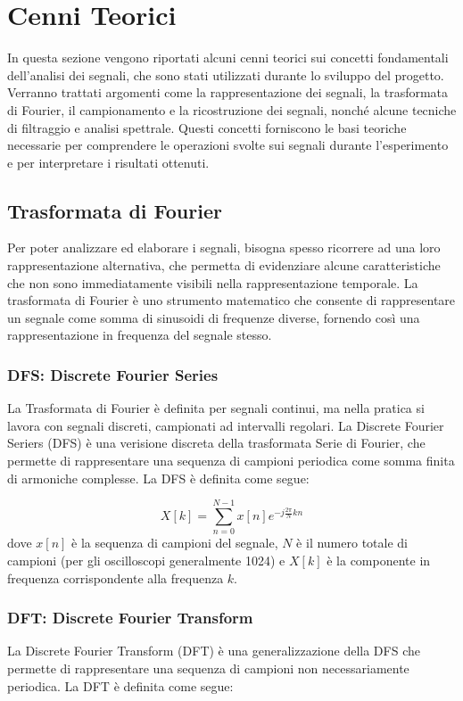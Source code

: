 \section{Cenni Teorici}
\label{sec:Teoria}
\thispagestyle{plain}
In questa sezione vengono riportati alcuni cenni teorici sui concetti fondamentali dell'analisi dei segnali, che sono stati utilizzati durante lo sviluppo del progetto. Verranno trattati argomenti come la rappresentazione dei segnali, la trasformata di Fourier, il campionamento e la ricostruzione dei segnali, nonché alcune tecniche di filtraggio e analisi spettrale. Questi concetti forniscono le basi teoriche necessarie per comprendere le operazioni svolte sui segnali durante l'esperimento e per interpretare i risultati ottenuti.

\subsection{Trasformata di Fourier}
Per poter analizzare ed elaborare i segnali, bisogna spesso ricorrere ad una loro rappresentazione alternativa, che permetta di evidenziare alcune caratteristiche che non sono immediatamente visibili nella rappresentazione temporale. La trasformata di Fourier è uno strumento matematico che consente di rappresentare un segnale come somma di sinusoidi di frequenze diverse, fornendo così una rappresentazione in frequenza del segnale stesso. 

\subsubsection{DFS: Discrete Fourier Series}
La Trasformata di Fourier è definita per segnali continui, ma nella pratica si lavora con segnali discreti, campionati ad intervalli regolari. La Discrete Fourier Seriers (DFS) è una verisione discreta della trasformata Serie di Fourier, che permette di rappresentare una sequenza di campioni periodica come somma finita di armoniche complesse. La DFS è definita come segue:

\begin{equation}
    \label{sec:DFS}
    X[k] = \sum_{n=0}^{N-1} x[n] e^{-j \frac{2\pi}{N} kn}
\end{equation}
dove $x[n]$ è la sequenza di campioni del segnale, $N$ è il numero totale di campioni (per gli oscilloscopi generalmente 1024) e $X[k]$ è la componente in frequenza corrispondente alla frequenza $k$.

\subsubsection{DFT: Discrete Fourier Transform}
La Discrete Fourier Transform (DFT) è una generalizzazione della DFS che permette di rappresentare una sequenza di campioni non necessariamente periodica. La DFT è definita come segue:

